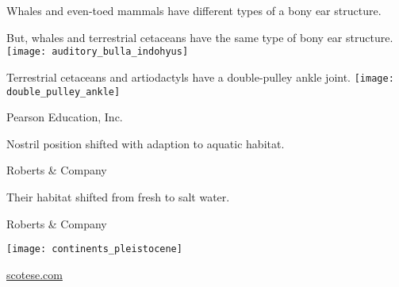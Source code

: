 \documentclass[t]{beamer}
\begin{document}
{
\begin{frame}[b]

\end{frame}
}
%
{
\begin{frame}[b]{Whales and even-toed mammals have different types of a bony ear structure.}

\end{frame}
}
%
\begin{frame}[t]{But, whales and terrestrial cetaceans have the same type of bony ear structure.}
	\texttt{[image: auditory\_bulla\_indohyus]}
\end{frame}
%
\begin{frame}[t]{Terrestrial cetaceans and artiodactyls have a double-pulley ankle joint.}
	\texttt{[image: double\_pulley\_ankle]}
	
	\vfilll
	
	\hfill \tiny \textcopyright Pearson Education, Inc.
\end{frame}
%
{
\begin{frame}[b]

\end{frame}
}
%
{
\begin{frame}[b]{Nostril position shifted with adaption to aquatic habitat.}

\tiny \textcopyright Roberts \& Company
\end{frame}
}
%
{
\begin{frame}[b]{Their habitat shifted from fresh to salt water.}

\tiny \textcopyright Roberts \& Company
\end{frame}
}
%
{
\begin{frame}[t]
	\texttt{[image: continents\_pleistocene]}
	
	\vfilll
	
	\hfill \tiny \textcolor{white}{\href{http://scotese.com}{scotese.com}}
\end{frame}
}
%
\end{document}
